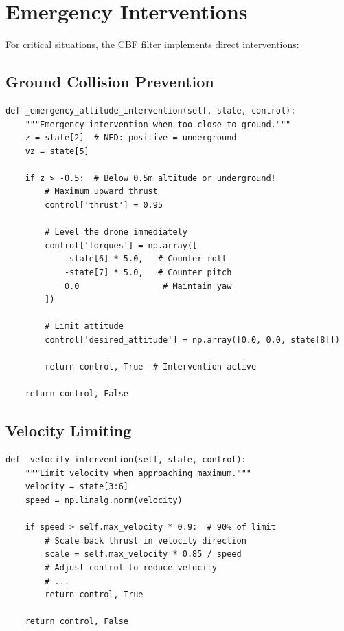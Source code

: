 \section{Emergency Interventions}

For critical situations, the CBF filter implements direct interventions:

\subsection{Ground Collision Prevention}

\begin{lstlisting}[caption={Emergency ground collision prevention}]
def _emergency_altitude_intervention(self, state, control):
    """Emergency intervention when too close to ground."""
    z = state[2]  # NED: positive = underground
    vz = state[5]

    if z > -0.5:  # Below 0.5m altitude or underground!
        # Maximum upward thrust
        control['thrust'] = 0.95

        # Level the drone immediately
        control['torques'] = np.array([
            -state[6] * 5.0,   # Counter roll
            -state[7] * 5.0,   # Counter pitch
            0.0                 # Maintain yaw
        ])

        # Limit attitude
        control['desired_attitude'] = np.array([0.0, 0.0, state[8]])

        return control, True  # Intervention active

    return control, False
\end{lstlisting}

\subsection{Velocity Limiting}

\begin{lstlisting}[caption={Velocity limiting intervention}]
def _velocity_intervention(self, state, control):
    """Limit velocity when approaching maximum."""
    velocity = state[3:6]
    speed = np.linalg.norm(velocity)

    if speed > self.max_velocity * 0.9:  # 90% of limit
        # Scale back thrust in velocity direction
        scale = self.max_velocity * 0.85 / speed
        # Adjust control to reduce velocity
        # ...
        return control, True

    return control, False
\end{lstlisting}

